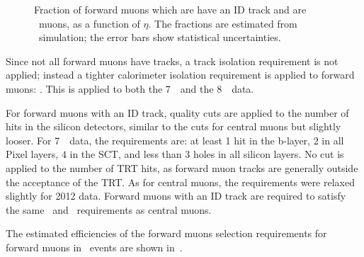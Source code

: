 \begin{figure}[h]
\centering
\caption[Fraction of forward muons which are \combined\ muons as a function of
$\eta$]{Fraction of forward
muons which are have an ID track and are \combined\ muons, as a function of
$\eta$. The fractions are estimated from \mc\ simulation; the error bars show
statistical uncertainties.}
\label{fig:fwdmu-frac-combined}
\end{figure}

Since not all forward muons
have tracks, a track isolation requirement is not applied; instead a tighter calorimeter isolation
requirement is applied to forward muons: . This is applied
to both the 7~\tev\ and the 8~\tev\ data.

For forward muons with an ID track, quality
cuts are applied to the number of hits in the silicon detectors, similar to the
cuts for central muons but slightly looser. For 7~\tev\ data,
the requirements are: at least 1 hit in the b-layer, $2$ in all Pixel layers,
$4$ in the SCT, and less than 3 holes 
in all silicon layers. No cut is applied to the number of TRT hits, as forward
muon tracks are generally outside the acceptance of the TRT. As for
central muons, the requirements were relaxed slightly for 2012 data.
Forward muons with an ID track are required to satisfy the same
\zzero\ and \dzerosig\ requirements as central muons.

The estimated efficiencies of the forward muons selection requirements for
forward muons in
\ZZ\ events are shown in~.

